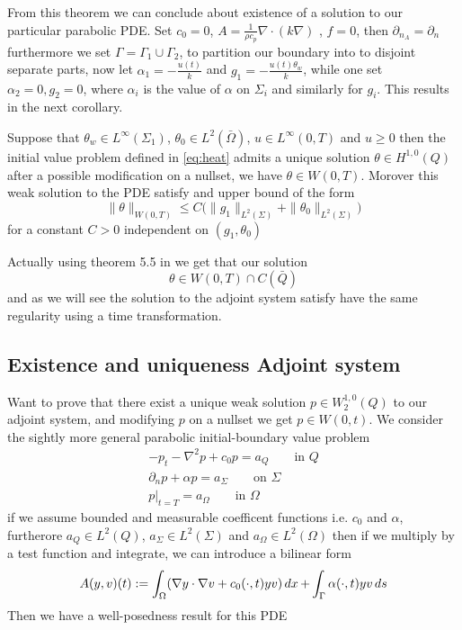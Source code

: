From this theorem we can conclude about existence of a solution to our particular parabolic PDE. Set $c_0 = 0$, $A = \frac{1}{\rho c_p}\nabla \cdot (k\nabla)$ , $f = 0$, then $\partial_{n_A} = \partial_n$ furthermore we set $\Gamma = \Gamma_1 \cup \Gamma_2$, to partition our boundary into to disjoint separate parts, now let $\alpha_1 = -\frac{u(t)}{k}$ and $g_1 = -\frac{u(t)\theta_w}{k}$, while one set $\alpha_2 = 0, g_2 = 0$, where $\alpha_i$ is the value of $\alpha$ on $\Sigma_i$ and similarly for $g_i$. This results in the next corollary. 

\begin{corollary}[Existence]
Suppose that $\theta_w \in L^{\infty}(\Sigma_1)$, $\theta_0 \in L^2(\bar{\Omega})$, $u \in L^{\infty}(0,T)$ and $u\geq 0$ then the initial value problem defined in \eqref{eq:heat} admits a unique solution $\theta \in H^{1,0}(Q)$ after a possible modification on a nullset, we have $\theta \in W(0,T)$. Morover this weak solution to the PDE satisfy and upper bound of the form 
\begin{equation*}
    \|\theta \|_{W(0,T)} \leq C\bigg ( \|g_1\|_{L^2(\Sigma)} + \|\theta_0\|_{L^2(\Sigma)} \bigg )
\end{equation*}
for a constant $C>0$ independent on $(g_1, \theta_0)$
\end{corollary}

Actually using theorem 5.5 in \cite{optimalControl} we get that our solution 
\begin{equation*}
    \theta \in W(0,T) \cap C (\bar{Q})
\end{equation*}
and as we will see the solution to the adjoint system satisfy have the same regularity using a time transformation. 


\subsection{Existence and uniqueness Adjoint system}
Want to prove that there exist a unique weak solution $p \in W_2^{1,0}(Q)$ to our adjoint system, and modifying $p$ on a nullset we get $p\in W(0,t)$. We consider the sightly more general parabolic initial-boundary value problem 
\begin{align*}
    -p_t -\nabla^2p +c_0p = a_Q \qquad \text{in } Q \\
    \partial_np + \alpha p = a_{\Sigma} \qquad \text{on } \Sigma \\
    p|_{t=T} = a_{\Omega} \qquad \text{in } \Omega
\end{align*}
if we assume bounded and measurable coefficent functions i.e. $c_0$ and $\alpha$, furtherore $a_Q \in L^2(Q)$, $a_{\Sigma} \in L^2(\Sigma)$ and $a_{\Omega} \in L^2(\Omega)$ then if we multiply by a test function and integrate, we can introduce a bilinear form
\begin{equation}
    \label{eq:parabolic_adj}
    A(y,v)(t) := \int_{\Omega}(\nabla y \cdot \nabla v + c_0(\cdot,t)yv) \mathop{dx} + \int_{\Gamma}\alpha(\cdot,t)yv \mathop{ds}
\end{equation}
Then we have a well-posedness result for this PDE

